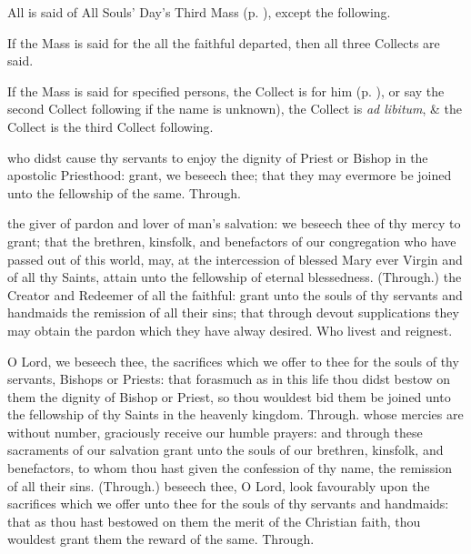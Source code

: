 \begin{rubric}
    All is said of All Souls' Day's Third Mass (p. \pageref{AllSoulsIII}), except the following.
\end{rubric}
\vspace{-0.5\baselineskip}
\begin{rubric}
    If the Mass is said for the all the faithful departed, then all three Collects are said.
\end{rubric}
\begin{rubric}
    If the Mass is said for specified persons, the  Collect is for him (p. \pageref{RequiemPrayers}), or say the second Collect following if the name is unknown), the  Collect is \emph{ad libitum}, \& the  Collect is the third Collect following.
\end{rubric}
 who didst cause thy servants to enjoy the dignity of Priest or Bishop in the apostolic Priesthood: grant, we beseech thee; that they may evermore be joined unto the fellowship of the same. Through.

 the giver of pardon and lover of man's salvation: we beseech thee of thy mercy to grant; that the brethren, kinsfolk, and benefactors of our congregation who have passed out of this world, may, at the intercession of blessed Mary ever Virgin and of all thy Saints, attain unto the fellowship of eternal blessedness. (Through.)
 the Creator and Redeemer of all the faithful: grant unto the souls of thy servants and handmaids the remission of all their sins; that through devout supplications they may obtain the pardon which they have alway desired. Who livest and reignest.

 O Lord, we beseech thee, the sacrifices which we offer to thee for the souls of thy servants, Bishops or Priests: that forasmuch as in this life thou didst bestow on them the dignity of Bishop or Priest, so thou wouldest bid them be joined unto the fellowship of thy Saints in the heavenly kingdom. Through.
 whose mercies are without number, graciously receive our humble prayers: and through these sacraments of our salvation grant unto the souls of our brethren, kinsfolk, and benefactors, to whom thou hast given the confession of thy name, the remission of all their sins. (Through.)
 beseech thee, O Lord, look favourably upon the sacrifices which we offer unto thee for the souls of thy servants and handmaids: that as thou hast bestowed on them the merit of the Christian faith, thou wouldest grant them the reward of the same. Through.

